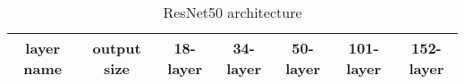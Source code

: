 \begin{table*}
\caption{\label{resnet50} ResNet50 architecture \cite{resnet-50}}
\begin{tabularx}{\textwidth}{|c|c|c|c|c|c|c|}
\hline
layer name & output size      & \multicolumn{1}{c|}{18-layer}                                                                                                                                                                                                                                                                                                          & \multicolumn{1}{c|}{34-layer}                                                                                                                                                                                                                                                                                                          & \multicolumn{1}{c|}{50-layer}                                                                                                                                                                                                                                                                                                                                                                                & \multicolumn{1}{c|}{101-layer}                                                                                                                                                                                                                                                                                                                                                                               & 152-layer                                                                                                                                                                                                                                                                                                                                                                               \\ \hline

\end{tabularx}
\end{table*}
